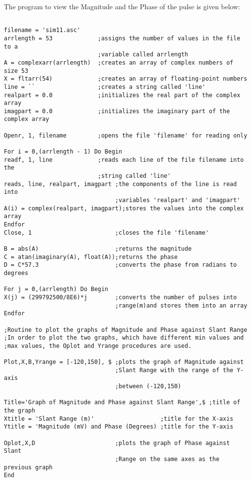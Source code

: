The program to view the Magnitude and the Phase of the pulse is given below:
\begin{verbatim}
 
filename = 'sim11.asc'
arrlength = 53             ;assigns the number of values in the file to a
                           ;variable called arrlength
A = complexarr(arrlength)  ;creates an array of complex numbers of size 53
X = fltarr(54)             ;creates an array of floating-point numbers
line = ``                  ;creates a string called 'line'
realpart = 0.0             ;initializes the real part of the complex array
imagpart = 0.0             ;initializes the imaginary part of the complex array
 
Openr, 1, filename         ;opens the file 'filename' for reading only
 
For i = 0,(arrlength - 1) Do Begin
readf, 1, line             ;reads each line of the file filename into the
                           ;string called 'line'
reads, line, realpart, imagpart ;the components of the line is read into
                                ;variables 'realpart' and 'imagpart'
A(i) = complex(realpart, imagpart);stores the values into the complex array
Endfor
Close, 1                        ;closes the file 'filename'
 
B = abs(A)                      ;returns the magnitude
C = atan(imaginary(A), float(A));returns the phase
D = C*57.3                      ;converts the phase from radians to degrees
 
For j = 0,(arrlength) Do Begin
X(j) = (299792500/8E6)*j        ;converts the number of pulses into
                                ;range(m)and stores them into an array
Endfor
 
;Routine to plot the graphs of Magnitude and Phase against Slant Range
;In order to plot the two graphs, which have different min values and
;max values, the Oplot and Yrange procedures are used.
 
Plot,X,B,Yrange = [-120,150], $ ;plots the graph of Magnitude against
                                ;Slant Range with the range of the Y-axis
                                ;between (-120,150)
 
Title='Graph of Magnitude and Phase against Slant Range',$ ;title of the graph
Xtitle = 'Slant Range (m)'                   ;title for the X-axis
Ytitle = 'Magnitude (mV) and Phase (Degrees) ;title for the Y-axis
 
Oplot,X,D                       ;plots the graph of Phase against Slant
                                ;Range on the same axes as the previous graph
End
\end{verbatim}

